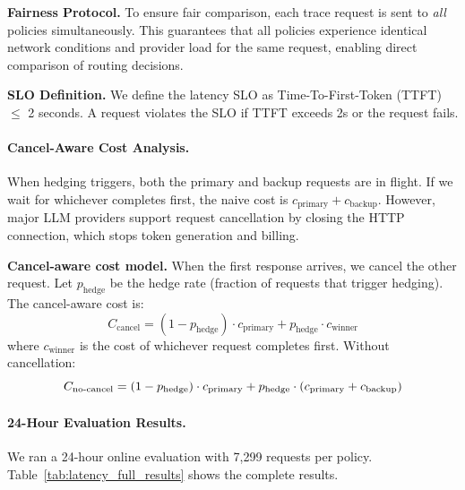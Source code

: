 \textbf{Fairness Protocol.} To ensure fair comparison, each trace request is sent to \emph{all} policies simultaneously. This guarantees that all policies experience identical network conditions and provider load for the same request, enabling direct comparison of routing decisions.

\textbf{SLO Definition.} We define the latency SLO as Time-To-First-Token (TTFT) $\le$ 2 seconds. A request violates the SLO if TTFT exceeds 2s or the request fails.

\paragraph{Cancel-Aware Cost Analysis.}
\label{app:cancel_aware}
When hedging triggers, both the primary and backup requests are in flight. If we wait for whichever completes first, the naive cost is $c_{\text{primary}} + c_{\text{backup}}$. However, major LLM providers support request cancellation by closing the HTTP connection, which stops token generation and billing.

\textbf{Cancel-aware cost model.} When the first response arrives, we cancel the other request. Let $p_{\text{hedge}}$ be the hedge rate (fraction of requests that trigger hedging). The cancel-aware cost is:
\begin{equation}
    C_{\text{cancel}} = (1 - p_{\text{hedge}}) \cdot c_{\text{primary}} + p_{\text{hedge}} \cdot c_{\text{winner}}
\end{equation}
where $c_{\text{winner}}$ is the cost of whichever request completes first. Without cancellation:
\begin{equation}
    C_{\text{no\text{-}cancel}} = (1 - p_{\text{hedge}}) \cdot c_{\text{primary}} + p_{\text{hedge}} \cdot (c_{\text{primary}} + c_{\text{backup}})
\end{equation}

\paragraph{24-Hour Evaluation Results.}

We ran a 24-hour online evaluation with 7,299 requests per policy. Table~\ref{tab:latency_full_results} shows the complete results.

